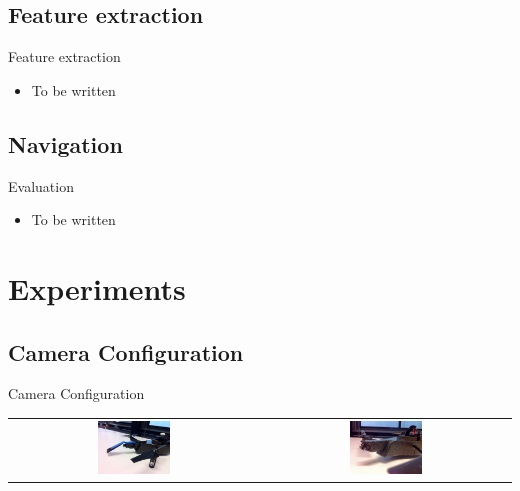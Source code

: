 \documentclass{beamer}
\begin{document}
\subsection{Feature extraction}
\begin{frame}
\begin{block}{Feature extraction}
\begin{itemize}
\item To be written
\end{itemize}
\end{block}
\end{frame}

\subsection{Navigation}
\begin{frame}
\begin{block}{Evaluation}
\begin{itemize}
\item To be written\end{itemize}
\end{block}
\end{frame}

\section{Experiments}
\subsection{Camera Configuration}
\begin{frame}
\begin{block}{Camera Configuration}
\begin{center}
\begin{tabular}{c c}
\includegraphics[width = 0.3\textwidth]{images/ardrone_mirror.jpg} & \includegraphics[width = 0.3\textwidth]{images/ardrone_modification.jpg}
\end{tabular}
\end{center}
\end{block}
\end{frame}
\end{document}
